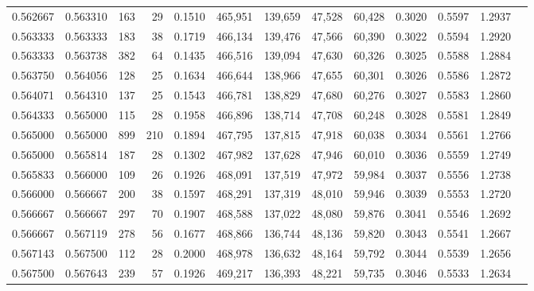 \begin{tabular}{rrrrrrrrrrrrr}
0.562667 & 0.563310 &   163 &  29 &                                     0.1510 & 465,951 & 139,659 &  47,528 &  60,428 & 0.3020 & 0.5597 & 1.2937 \\
0.563333 & 0.563333 &   183 &  38 &                                     0.1719 & 466,134 & 139,476 &  47,566 &  60,390 & 0.3022 & 0.5594 & 1.2920 \\
0.563333 & 0.563738 &   382 &  64 &                                     0.1435 & 466,516 & 139,094 &  47,630 &  60,326 & 0.3025 & 0.5588 & 1.2884 \\
0.563750 & 0.564056 &   128 &  25 &                                     0.1634 & 466,644 & 138,966 &  47,655 &  60,301 & 0.3026 & 0.5586 & 1.2872 \\
0.564071 & 0.564310 &   137 &  25 &                                     0.1543 & 466,781 & 138,829 &  47,680 &  60,276 & 0.3027 & 0.5583 & 1.2860 \\
0.564333 & 0.565000 &   115 &  28 &                                     0.1958 & 466,896 & 138,714 &  47,708 &  60,248 & 0.3028 & 0.5581 & 1.2849 \\
0.565000 & 0.565000 &   899 & 210 &                                     0.1894 & 467,795 & 137,815 &  47,918 &  60,038 & 0.3034 & 0.5561 & 1.2766 \\
0.565000 & 0.565814 &   187 &  28 &                                     0.1302 & 467,982 & 137,628 &  47,946 &  60,010 & 0.3036 & 0.5559 & 1.2749 \\
0.565833 & 0.566000 &   109 &  26 &                                     0.1926 & 468,091 & 137,519 &  47,972 &  59,984 & 0.3037 & 0.5556 & 1.2738 \\
0.566000 & 0.566667 &   200 &  38 &                                     0.1597 & 468,291 & 137,319 &  48,010 &  59,946 & 0.3039 & 0.5553 & 1.2720 \\
0.566667 & 0.566667 &   297 &  70 &                                     0.1907 & 468,588 & 137,022 &  48,080 &  59,876 & 0.3041 & 0.5546 & 1.2692 \\
0.566667 & 0.567119 &   278 &  56 &                                     0.1677 & 468,866 & 136,744 &  48,136 &  59,820 & 0.3043 & 0.5541 & 1.2667 \\
0.567143 & 0.567500 &   112 &  28 &                                     0.2000 & 468,978 & 136,632 &  48,164 &  59,792 & 0.3044 & 0.5539 & 1.2656 \\
0.567500 & 0.567643 &   239 &  57 &                                     0.1926 & 469,217 & 136,393 &  48,221 &  59,735 & 0.3046 & 0.5533 & 1.2634 \\

\end{tabular}
